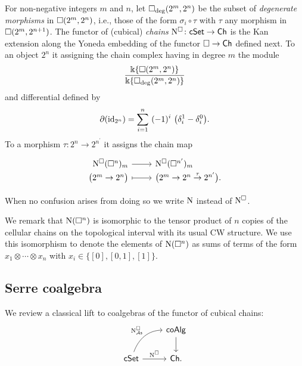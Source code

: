 For non-negative integers $m$ and $n$, let $\square_{\deg}(2^m, 2^n)$ be the subset of \textit{degenerate morphisms} in $\square(2^m, 2^n)$, i.e., those of the form $\sigma_i \circ \tau$ with $\tau$ any morphism in $\square(2^m, 2^{n+1})$.
The functor of (cubical) \textit{chains} $\operatorname{N^{\square}} \colon \mathsf{cSet} \to \mathsf{Ch}$ is the Kan extension along the Yoneda embedding of the functor $\square \to \mathsf{Ch}$ defined next.
To an object $2^n$ it assigning the chain complex having in degree $m$ the module
\begin{equation*}
\frac{\Bbbk\{\square(2^m, 2^n)\}}{\Bbbk\{\square_{\deg}(2^m, 2^n)\}}
\end{equation*}
and differential defined by
\begin{equation*}
\partial (\id_{2^n}) = \sum_{i=1}^{n} \ (-1)^i \
\big(\delta_i^1 - \delta_i^0 \big).
\end{equation*}
To a morphism $\tau \colon 2^n \to 2^{n^\prime}$ it assigns the chain map
\begin{equation*}
\begin{tikzcd}[row sep=-3pt, column sep=normal,
/tikz/column 1/.append style={anchor=base east},
/tikz/column 2/.append style={anchor=base west}]
\cchains(\cube^n)_m \arrow[r] &  \cchains(\cube^{n^\prime})_m \\
\big( 2^m \to 2^n \big) \arrow[r, mapsto] & \big( 2^m \to 2^n \stackrel{\tau}{\to} 2^{n^\prime} \big).
\end{tikzcd}
\end{equation*}

When no confusion arises from doing so we write $\operatorname{N}$ instead of $\operatorname{N^{\square}}$.

We remark that $\operatorname{N}(\square^n)$ is isomorphic to the tensor product of $n$ copies of the cellular chains on the topological interval with its usual CW structure.
We use this isomorphism to denote the elements of $\operatorname{N}(\square^n)$ as sums of terms of the form $x_1 \otimes \cdots \otimes x_n$ with $x_i \in \big\{[0], [0,1], [1] \big\}$.

\subsection{Serre coalgebra} \label{ss:serre coalgebra}

We review a classical lift to coalgebras of the functor of cubical chains:
\begin{equation*}
\begin{tikzcd}
& \coAlg \arrow[d] \\
\cSet \arrow[r, "\cchains"] \arrow[ur, "\cchainsAS", out=70, in=180] & \Ch.
\end{tikzcd}
\end{equation*}

